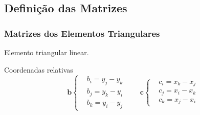 \documentclass{beamer}
\begin{document}
\subsection{Definição das Matrizes}
\begin{frame}
  \frametitle{Matrizes dos Elementos Triangulares}
  
  \fontsize{7.5}{7.2}\selectfont
  \begin{minipage}{.4\textwidth}
    \centering
     {\raggedleft \tiny Elemento triangular linear.}
  \end{minipage}
  \hfill
  \begin{minipage}{.56\textwidth}
    \begin{block}{Coordenadas relativas}
      \vspace*{-\baselineskip}\setlength\belowdisplayshortskip{0pt} %
      \centering
      \begin{equation*}
      \mathbf{b} \left\{
	\begin{align*}
	  &b_i = y_j - y_k \\
	  &b_j = y_k - y_i \\
	  &b_k = y_i - y_j
	\end{align*} \right.\qquad
      \mathbf{c} \left\{
	\begin{align*}
	  &c_i = x_k - x_j \\
	  &c_j = x_i - x_k \\
	  &c_k = x_j - x_i
	\end{align*} \right.
      \end{equation*}
    \end{block}
    

\end{minipage}
\end{frame}
\end{document}
